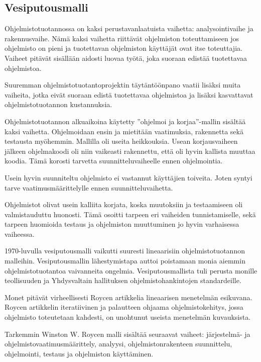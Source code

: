 \documentclass[finnish]{tktltiki2}
\theoremstyle{definition}
\theoremstyle{remark}
\begin{document}
\subsection{Vesiputousmalli}

Ohjelmistotuotannossa on kaksi perustavanlaatuista vaihetta: analysointivaihe ja rakennusvaihe. Nämä kaksi vaihetta riittävät ohjelmiston toteuttamiseen jos ohjelmisto on pieni ja tuotettavan ohjelmiston käyttäjät ovat itse toteuttajia. Vaiheet pitävät sisällään aidosti luovaa työtä, joka suoraan edistää tuotettavaa ohjelmistoa\cite{ROY70}.

Suuremman ohjelmistotuotantoprojektin täytäntöönpano vaatii lisäksi muita vaiheita, jotka eivät suoraan edistä tuotettavaa ohjelmistoa ja lisäksi kasvattavat ohjelmistotuotannon kustannuksia\cite{ROY70}.

Ohjelmistotuotannon alkuaikoina käytetty ''ohjelmoi ja korjaa''-mallin sisältää kaksi vaihetta. Ohjelmoidaan ensin ja mietitään vaatimuksia, rakennetta sekä testausta myöhemmin. Mallilla oli useita heikkouksia. Usean korjausvaiheen jälkeen ohjelmakoodi oli niin vaikeasti rakennettu, että oli hyvin kallista muuttaa koodia. Tämä korosti tarvetta suunnitteluvaiheelle ennen ohjelmointia\cite{BOE88}.

Usein hyvin suunniteltu ohjelmisto ei vastannut käyttäjien toiveita. Joten syntyi tarve vaatimusmäärittelylle ennen suunnitteluvaihetta\cite{BOE88}. 

Ohjelmistot olivat usein kalliita korjata, koska muutoksiin ja testaamiseen oli valmistauduttu huonosti. Tämä osoitti tarpeen eri vaiheiden tunnistamiselle, sekä tarpeen huomioida testaus ja ohjelmiston muuttuminen jo hyvin varhaisessa vaiheessa\cite{BOE88}. 

1970-luvulla vesiputousmalli vaikutti suuresti lineaarisiin ohjelmistotuotannon malleihin. Vesiputousmallin lähestymistapa auttoi poistamaan monia aiemmin ohjelmistotuotantoa vaivanneita ongelmia. Vesiputousmallista tuli perusta monille teollisuuden ja Yhdysvaltain hallituksen ohjelmistohankintojen standardeille\cite{BOE88}.

Monet pitävät virheellisesti Roycen artikkelia lineaarisen menetelmän esikuvana. Roycen artikkelin iteratiivinen ja palautteen ohjaama ohjelmistokehitys, jossa ohjelmisto toteutetaan kahdesti, on unohtunut useista menetelmän kuvauksista\cite{LAB03}.

Tarkemmin Winston W. Roycen malli sisältää seuraavat vaiheet: järjestelmä- ja ohjelmistovaatimusmäärittely, analyysi, ohjelmistonrakenteen suunnittelu, ohjelmointi, testaus ja ohjelmiston käyttäminen\cite{ROY70}. 
\end{document}
